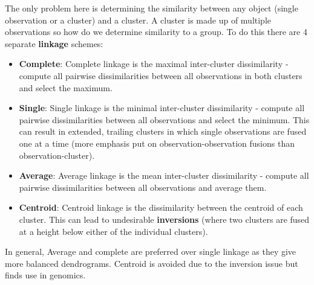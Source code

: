 The only problem here is determining the similarity between any object (single observation or a cluster) and a cluster. A cluster is made up of multiple observations so how do we determine similarity to a group. To do this there are 4 separate \textbf{linkage} schemes:

\begin{itemize}
    \item \textbf{Complete}: Complete linkage is the maximal inter-cluster dissimilarity - compute all pairwise dissimilarities between all observations in both clusters and select the maximum.
    \item \textbf{Single}: Single linkage is the minimal inter-cluster dissimilarity - compute all pairwise dissimilarities between all observations and select the minimum. This can result in extended, trailing clusters in which single observations are fused one at a time (more emphasis put on observation-observation fusions than observation-cluster).
    \item \textbf{Average}: Average linkage is the mean inter-cluster dissimilarity - compute all pairwise dissimilarities between all observations and average them.
    \item \textbf{Centroid}: Centroid linkage is the dissimilarity between the centroid of each cluster. This can lead to undesirable \textbf{inversions} (where two clusters are fused at a height below either of the individual clusters).
\end{itemize}

In general, Average and complete are preferred over single linkage as they give more balanced dendrograms. Centroid is avoided due to the inversion issue but finds use in genomics.
